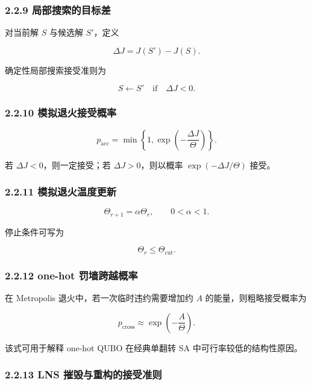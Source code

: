 \documentclass[
  a4paper,
]{ctexart}
\begin{document}
\subsubsection{2.2.9
局部搜索的目标差}\label{ux5c40ux90e8ux641cux7d22ux7684ux76eeux6807ux5dee}

对当前解 \(S\) 与候选解 \(S'\)，定义

\[
\Delta J=J(S')-J(S).
\]

确定性局部搜索接受准则为

\[
S\leftarrow S'\quad \text{if}\quad \Delta J<0.
\]

\subsubsection{2.2.10
模拟退火接受概率}\label{ux6a21ux62dfux9000ux706bux63a5ux53d7ux6982ux7387}

\[
p_{\mathrm{acc}}=\min\left\{1,\exp\left(-\frac{\Delta J}{\Theta}\right)\right\}.
\]

若 \(\Delta J<0\)，则一定接受；若 \(\Delta J>0\)，则以概率
\(\exp(-\Delta J/\Theta)\) 接受。

\subsubsection{2.2.11
模拟退火温度更新}\label{ux6a21ux62dfux9000ux706bux6e29ux5ea6ux66f4ux65b0}

\[
\Theta_{r+1}=\alpha \Theta_r,
\qquad 0<\alpha<1.
\]

停止条件可写为

\[
\Theta_r\le \Theta_{\mathrm{cut}}.
\]

\subsubsection{2.2.12 one-hot
罚墙跨越概率}\label{one-hot-ux7f5aux5899ux8de8ux8d8aux6982ux7387}

在 Metropolis 退火中，若一次临时违约需要增加约 \(A\)
的能量，则粗略接受概率为

\[
p_{\mathrm{cross}}\approx \exp\left(-\frac{A}{\Theta}\right).
\]

该式可用于解释 one-hot QUBO 在经典单翻转 SA 中可行率较低的结构性原因。

\subsubsection{2.2.13 LNS
摧毁与重构的接受准则}\label{lns-ux6467ux6bc1ux4e0eux91cdux6784ux7684ux63a5ux53d7ux51c6ux5219}
\end{document}
